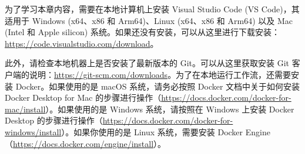 为了学习本章内容，需要在本地计算机上安装 Visual Studio Code (VS Code)，其适用于 Windows (x64、x86 和 Arm64)、Linux (x64、x86 和 Arm64) 以及 Mac (Intel 和 Apple silicon) 系统。如果还没有安装，可以从这里进行下载安装：\url{https://code.visualstudio.com/download}。

此外，请检查本地机器上是否安装了最新版本的 Git。可以从这里获取安装 Git 客户端的说明：\url{https://git-scm.com/downloads}。为了在本地运行工作流，还需要安装 Docker。如果使用的是 macOS 系统，请务必按照 Docker 文档中关于如何安装 Docker Desktop for Mac 的步骤进行操作（\url{https://docs.docker.com/docker-for-mac/install}）。如果使用的是 Windows 系统，请按照在 Windows 上安装 Docker Desktop 的步骤进行操作（\url{https://docs.docker.com/docker-for-windows/install}）。如果你使用的是 Linux 系统，需要安装 Docker Engine（\url{https://docs.docker.com/engine/install}）。